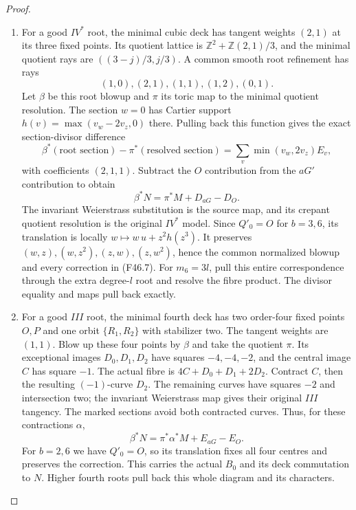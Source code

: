 \begin{proof}
\begin{enumerate}[label=\arabic*.]
\par\medskip\noindent\textbf{The two line comparisons.}
At a reduced root, $aG'$ has identity component and
$N=\mathcal O(aG'-O)$ has degree zero on every component.
The original $M$ has the same zero multidegrees at that site.
Pull it to the resolved fibre product first. Every curve
contracted in relative minimalization has degree zero, so the
blowup Picard decomposition descends the line through each
actual contraction. Its comparison with $N$ is a vertical
divisor with zero component degrees. The reduced $III$ or $IV$
intersection matrix has integral kernel the whole-fibre vector.
The corresponding base monomial therefore gives the line
isomorphism and retains its deck character and the specified $B_0$.

\item For a good $IV^*$ root, the minimal cubic deck has tangent
weights $(2,1)$ at its three fixed points. Its quotient lattice
is $\mathbb Z^2+\mathbb Z(2,1)/3$, and the minimal quotient
rays are $((3-j)/3,j/3)$. A common smooth root refinement has rays
\[
                  (1,0),(2,1),(1,1),(1,2),(0,1).
\]
Let $\beta$ be this root blowup and $\pi$ its toric map to the
minimal quotient resolution. The section $w=0$ has Cartier
support $h(v)=\max(v_w-2v_z,0)$ there. Pulling back this
function gives the exact section-divisor difference
\[
 \beta^*(\text{root section})-\pi^*(\text{resolved section})
       =\sum_v\min(v_w,2v_z)E_v,
\]
with coefficients $(2,1,1)$. Subtract the $O$ contribution from
the $aG'$ contribution to obtain
\[
                    \beta^*N=\pi^*M+D_{aG}-D_O.                \tag{F46.7}
\]
The invariant Weierstrass substitution is the source map, and
its crepant quotient resolution is the original $IV^*$ model.
Since $Q'_0=O$ for $b=3,6$, its translation is locally
$w\mapsto w\,u+z^2h(z^3)$. It preserves
$(w,z),(w,z^2),(z,w),(z,w^2)$, hence the common normalized
blowup and every correction in (F46.7). For $m_6=3l$, pull this
entire correspondence through the extra degree-$l$ root and
resolve the fibre product. The divisor equality and maps pull
back exactly.

\item For a good $III$ root, the minimal fourth deck has two
order-four fixed points $O,P$ and one orbit $\{R_1,R_2\}$
with stabilizer two. The tangent weights are $(1,1)$.
Blow up these four points by $\beta$ and take the quotient
$\pi$. Its exceptional images $D_0,D_1,D_2$ have squares
$-4,-4,-2$, and the central image $C$ has square $-1$.
The actual fibre is $4C+D_0+D_1+2D_2$. Contract $C$, then the
resulting $(-1)$-curve $D_2$. The remaining curves have squares
$-2$ and intersection two; the invariant Weierstrass map gives
their original $III$ tangency. The marked sections avoid both
contracted curves. Thus, for these contractions $\alpha$,
\[
                 \beta^*N=\pi^*\alpha^*M+E_{aG}-E_O.           \tag{F46.8}
\]
For $b=2,6$ we have $Q'_0=O$, so its translation fixes all four
centres and preserves the correction. This carries the actual
$B_0$ and its deck commutation to $N$. Higher fourth roots
pull back this whole diagram and its characters.


\end{enumerate}
\end{proof}
